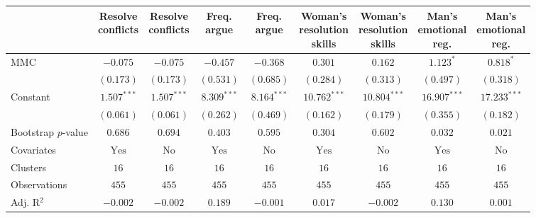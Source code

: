 
\begin{tabular}{l c c c c c c c c}
\toprule
 & \shortstack{Resolve \\ conflicts} & \shortstack{Resolve \\ conflicts} & \shortstack{Freq. \\ argue} & \shortstack{Freq. \\ argue} & \shortstack{Woman's \\ resolution \\ skills} & \shortstack{Woman's \\ resolution \\ skills} & \shortstack{Man's \\ emotional \\ reg.} & \shortstack{Man's \\ emotional \\ reg.} \\
\midrule
MMC                 & $-0.075$       & $-0.075$      & $-0.457$       & $-0.368$      & $0.301$        & $0.162$        & $1.123^{*}$    & $0.818^{*}$    \\
                    & $(0.173)$      & $(0.173)$     & $(0.531)$      & $(0.685)$     & $(0.284)$      & $(0.313)$      & $(0.497)$      & $(0.318)$      \\
Constant            & $1.507^{***}$  & $1.507^{***}$ & $8.309^{***}$  & $8.164^{***}$ & $10.762^{***}$ & $10.804^{***}$ & $16.907^{***}$ & $17.233^{***}$ \\
                    & $(0.061)$      & $(0.061)$     & $(0.262)$      & $(0.469)$     & $(0.162)$      & $(0.179)$      & $(0.355)$      & $(0.182)$      \\
\midrule
Bootstrap $p$-value & $0.686$        & $0.694$       & $0.403$        & $0.595$       & $0.304$        & $0.602$        & $0.032$        & $0.021$        \\
Covariates          & $\textrm{Yes}$ & $\textrm{No}$ & $\textrm{Yes}$ & $\textrm{No}$ & $\textrm{Yes}$ & $\textrm{No}$  & $\textrm{Yes}$ & $\textrm{No}$  \\
Clusters            & $16$           & $16$          & $16$           & $16$          & $16$           & $16$           & $16$           & $16$           \\
Observations        & $455$          & $455$         & $455$          & $455$         & $455$          & $455$          & $455$          & $455$          \\
Adj. R$^2$          & $-0.002$       & $-0.002$      & $0.189$        & $-0.001$      & $0.017$        & $-0.002$       & $0.130$        & $0.001$        \\

\end{tabular}
